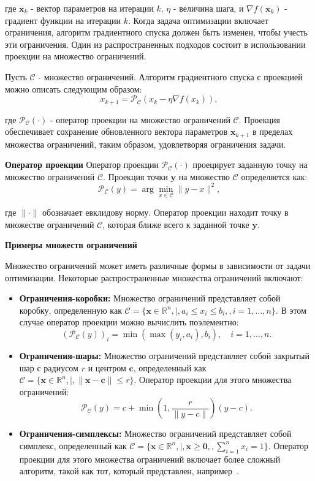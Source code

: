 где $\mathbf{x}_k$ - вектор параметров на итерации $k$,
$\eta$ - величина шага, и $\nabla f(\mathbf{x}_k)$ - градиент
функции на итерации $k$.
Когда задача оптимизации включает ограничения, алгоритм
градиентного спуска должен быть изменен, чтобы учесть эти ограничения.
Один из распространенных подходов состоит в использовании проекции
на множество ограничений.


Пусть $\mathcal{C}$ - множество ограничений.
Алгоритм градиентного спуска с проекцией
можно описать следующим образом:
\[ x_{k+1} = \mathcal{P}_{\mathcal{C}}(x_k - \eta \nabla f(x_k)), \]

где $\mathcal{P}_{\mathcal{C}}(\cdot)$ - оператор проекции
на множество ограничений $\mathcal{C}$.
Проекция обеспечивает сохранение обновленного
вектора параметров $\mathbf{x}_{k+1}$ в пределах множества
ограничений, таким образом, удовлетворяя ограничения задачи.

\textbf{Оператор проекции}
Оператор проекции $\mathcal{P}_{\mathcal{C}}(\cdot)$
проецирует заданную точку на множество ограничений $\mathcal{C}$.
Проекция точки $\mathbf{y}$ на множество $\mathcal{C}$ определяется как:
\[
    \mathcal{P}_{\mathcal{C}}(y) =
\arg \min_{x \in \mathcal{C}} \|y - x\|^2,
\]

где $\|\cdot\|$ обозначает евклидову норму.
Оператор проекции находит точку в множестве ограничений
$\mathcal{C}$, которая ближе всего к заданной точке $\mathbf{y}$.

\textbf{Примеры множеств ограничений}

Множество ограничений может иметь различные формы
в зависимости от задачи оптимизации.
Некоторые распространенные множества ограничений включают:
\begin{itemize}
\item \textbf{Ограничения-коробки:} Множество ограничений представляет
собой коробку, определенную как
$\mathcal{C} = \{\mathbf{x} \in \mathbb{R}^n , | , a_i
\leq x_i \leq b_i, , i=1,\dots,n\}$.
В этом случае оператор проекции можно вычислить поэлементно:
\[
(\mathcal{P}_{\mathcal{C}}(y))_i =
\min(\max(y_i, a_i), b_i), \quad i=1,\dots,n.
\]

\item \textbf{Ограничения-шары:} Множество ограничений представляет
собой закрытый шар с радиусом $r$ и центром $\mathbf{c}$,
определенный как $\mathcal{C} = \{\mathbf{x} \in \mathbb{R}^n , | ,
\|\mathbf{x} - \mathbf{c}\| \leq r\}$.
Оператор проекции для этого множества ограничений:
\[
\mathcal{P}_{\mathcal{C}}(y) = c
+ \min\left(1, \frac{r}{\|y-c\|}\right)(y-c).
\]
\item \textbf{Ограничения-симплексы:} Множество ограничений
представляет собой симплекс, определенный как
$\mathcal{C} = \{\mathbf{x} \in \mathbb{R}^n ,
| , \mathbf{x} \geq \mathbf{0}, , \sum_{i=1}^n x_i = 1\}$.
Оператор проекции для этого множества ограничений включает
более сложный алгоритм, такой как тот,
который представлен, например~\cite{Duchi2011}.
\end{itemize}

